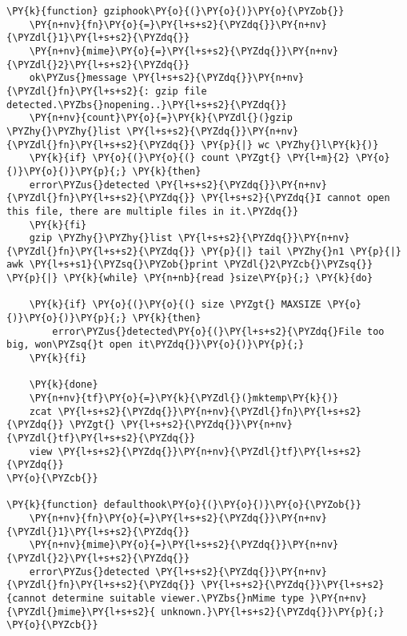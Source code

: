 \begin{Verbatim}[commandchars=\\\{\}]
\PY{k}{function} gziphook\PY{o}{(}\PY{o}{)}\PY{o}{\PYZob{}}
    \PY{n+nv}{fn}\PY{o}{=}\PY{l+s+s2}{\PYZdq{}}\PY{n+nv}{\PYZdl{}1}\PY{l+s+s2}{\PYZdq{}}
    \PY{n+nv}{mime}\PY{o}{=}\PY{l+s+s2}{\PYZdq{}}\PY{n+nv}{\PYZdl{}2}\PY{l+s+s2}{\PYZdq{}}
    ok\PYZus{}message \PY{l+s+s2}{\PYZdq{}}\PY{n+nv}{\PYZdl{}fn}\PY{l+s+s2}{: gzip file detected.\PYZbs{}nopening..}\PY{l+s+s2}{\PYZdq{}}
    \PY{n+nv}{count}\PY{o}{=}\PY{k}{\PYZdl{}(}gzip \PYZhy{}\PYZhy{}list \PY{l+s+s2}{\PYZdq{}}\PY{n+nv}{\PYZdl{}fn}\PY{l+s+s2}{\PYZdq{}} \PY{p}{|} wc \PYZhy{}l\PY{k}{)}
    \PY{k}{if} \PY{o}{(}\PY{o}{(} count \PYZgt{} \PY{l+m}{2} \PY{o}{)}\PY{o}{)}\PY{p}{;} \PY{k}{then}
	error\PYZus{}detected \PY{l+s+s2}{\PYZdq{}}\PY{n+nv}{\PYZdl{}fn}\PY{l+s+s2}{\PYZdq{}} \PY{l+s+s2}{\PYZdq{}I cannot open this file, there are multiple files in it.\PYZdq{}}
    \PY{k}{fi}
    gzip \PYZhy{}\PYZhy{}list \PY{l+s+s2}{\PYZdq{}}\PY{n+nv}{\PYZdl{}fn}\PY{l+s+s2}{\PYZdq{}} \PY{p}{|} tail \PYZhy{}n1 \PY{p}{|} awk \PY{l+s+s1}{\PYZsq{}\PYZob{}print \PYZdl{}2\PYZcb{}\PYZsq{}} \PY{p}{|} \PY{k}{while} \PY{n+nb}{read }size\PY{p}{;} \PY{k}{do}

	\PY{k}{if} \PY{o}{(}\PY{o}{(} size \PYZgt{} MAXSIZE \PY{o}{)}\PY{o}{)}\PY{p}{;} \PY{k}{then}
	    error\PYZus{}detected\PY{o}{(}\PY{l+s+s2}{\PYZdq{}File too big, won\PYZsq{}t open it\PYZdq{}}\PY{o}{)}\PY{p}{;}
	\PY{k}{fi}

    \PY{k}{done}
    \PY{n+nv}{tf}\PY{o}{=}\PY{k}{\PYZdl{}(}mktemp\PY{k}{)}
    zcat \PY{l+s+s2}{\PYZdq{}}\PY{n+nv}{\PYZdl{}fn}\PY{l+s+s2}{\PYZdq{}} \PYZgt{} \PY{l+s+s2}{\PYZdq{}}\PY{n+nv}{\PYZdl{}tf}\PY{l+s+s2}{\PYZdq{}}
    view \PY{l+s+s2}{\PYZdq{}}\PY{n+nv}{\PYZdl{}tf}\PY{l+s+s2}{\PYZdq{}}
\PY{o}{\PYZcb{}}

\PY{k}{function} defaulthook\PY{o}{(}\PY{o}{)}\PY{o}{\PYZob{}}
    \PY{n+nv}{fn}\PY{o}{=}\PY{l+s+s2}{\PYZdq{}}\PY{n+nv}{\PYZdl{}1}\PY{l+s+s2}{\PYZdq{}}
    \PY{n+nv}{mime}\PY{o}{=}\PY{l+s+s2}{\PYZdq{}}\PY{n+nv}{\PYZdl{}2}\PY{l+s+s2}{\PYZdq{}}
    error\PYZus{}detected \PY{l+s+s2}{\PYZdq{}}\PY{n+nv}{\PYZdl{}fn}\PY{l+s+s2}{\PYZdq{}} \PY{l+s+s2}{\PYZdq{}}\PY{l+s+s2}{cannot determine suitable viewer.\PYZbs{}nMime type }\PY{n+nv}{\PYZdl{}mime}\PY{l+s+s2}{ unknown.}\PY{l+s+s2}{\PYZdq{}}\PY{p}{;}
\PY{o}{\PYZcb{}}


\end{Verbatim}
